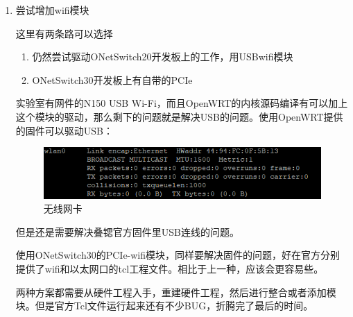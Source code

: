 \documentclass{itecreport-zh}
\begin{document}
\begin{enumerate}
    \item 尝试增加wifi模块


    这里有两条路可以选择
    \begin{enumerate}
      \item 仍然尝试驱动ONetSwitch20开发板上的工作，用USBwifi模块
      \item ONetSwitch30开发板上有自带的PCIe
    \end{enumerate}

      实验室有网件的N150 USB Wi-Fi，而且OpenWRT的内核源码编译有可以加上这个模块的驱动，那么剩下的问题就是解决USB的问题。使用OpenWRT提供的固件可以驱动USB：
      \begin{figure}[!h]
      \centering
      \includegraphics[width=\textwidth]{wlan.png}
      \caption{无线网卡}
      \end{figure}
      但是还是需要解决叠锶官方固件里USB连线的问题。


      使用ONetSwitch30的PCIe-wifi模块，同样要解决固件的问题，好在官方分别提供了wifi和以太网口的tcl工程文件。相比于上一种，应该会更容易些。


      两种方案都需要从硬件工程入手，重建硬件工程，然后进行整合或者添加模块。但是官方Tcl文件运行起来还有不少BUG，折腾完了最后的时间。

\end{enumerate}
\end{document}
